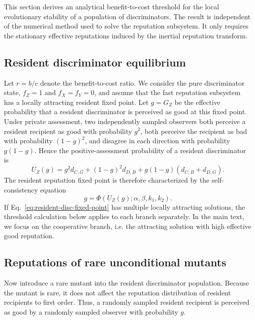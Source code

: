 \documentclass[fleqn,10pt]{wlscirep}
\begin{document}
This section derives an analytical benefit-to-cost threshold for the local evolutionary stability of a population of discriminators. The result is independent of the numerical method used to solve the reputation subsystem. It only requires the stationary effective reputations induced by the inertial reputation transform.

\subsection*{Resident discriminator equilibrium}

Let $r=b/c$ denote the benefit-to-cost ratio. We consider the pure discriminator state, $f_Z=1$ and $f_X=f_Y=0$, and assume that the fast reputation subsystem has a locally attracting resident fixed point. Let $g=G_Z$ be the effective probability that a resident discriminator is perceived as good at this fixed point. Under private assessment, two independently sampled observers both perceive a resident recipient as good with probability $g^2$, both perceive the recipient as bad with probability $(1-g)^2$, and disagree in each direction with probability $g(1-g)$. Hence the positive-assessment probability of a resident discriminator is
\begin{equation}
\label{eq:resident-disc-positive-prob}
U_Z(g)=g^2d_{C,G}+(1-g)^2d_{D,B}+g(1-g)(d_{C,B}+d_{D,G}).
\end{equation}
The resident reputation fixed point is therefore characterized by the self-consistency equation
\begin{equation}
\label{eq:resident-disc-fixed-point}
g=\Phi\!\left(U_Z(g);\alpha,\beta,k_1,k_2\right).
\end{equation}
If Eq.~\eqref{eq:resident-disc-fixed-point} has multiple locally attracting solutions, the threshold calculation below applies to each branch separately. In the main text, we focus on the cooperative branch, i.e. the attracting solution with high effective good reputation.

\subsection*{Reputations of rare unconditional mutants}

Now introduce a rare mutant into the resident discriminator population. Because the mutant is rare, it does not affect the reputation distribution of resident recipients to first order. Thus, a randomly sampled resident recipient is perceived as good by a randomly sampled observer with probability $g$.
\end{document}
